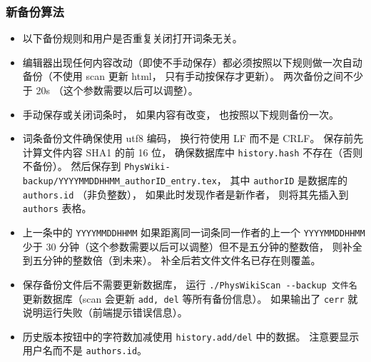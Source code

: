 \subsubsection{新备份算法}
\begin{itemize}
\item 以下备份规则和用户是否重复关闭打开词条无关。
\item 编辑器出现任何内容改动（即使不手动保存）都必须按照以下规则做一次自动备份（不使用 scan 更新 html， 只有手动按保存才更新）。 两次备份之间不少于 20s （这个参数需要以后可以调整）。
\item 手动保存或关闭词条时， 如果内容有改变， 也按照以下规则备份一次。
\item 词条备份文件确保使用 utf8 编码， 换行符使用 LF 而不是 CRLF。 保存前先计算文件内容 SHA1 的前 16 位， 确保数据库中 \verb|history.hash| 不存在（否则不备份）。 然后保存到 \verb|PhysWiki-backup/YYYYMMDDHHMM_authorID_entry.tex|， 其中 \verb|authorID| 是数据库的 \verb|authors.id| （非负整数）， 如果此时发现作者是新作者， 则将其先插入到 \verb|authors| 表格。
\item 上一条中的 \verb|YYYYMMDDHHMM| 如果距离同一词条同一作者的上一个 \verb|YYYYMMDDHHMM| 少于 30 分钟（这个参数需要以后可以调整）但不是五分钟的整数倍， 则补全到五分钟的整数倍（到未来）。 补全后若文件文件名已存在则覆盖。
\item 保存备份文件后不需要更新数据库， 运行 \verb|./PhysWikiScan --backup 文件名| 更新数据库（scan 会更新 \verb|add, del| 等所有备份信息）。 如果输出了 \verb|cerr| 就说明运行失败（前端提示错误信息）。
\item 历史版本按钮中的字符数加减使用 \verb|history.add/del| 中的数据。 注意要显示用户名而不是 \verb|authors.id|。
\end{itemize}

